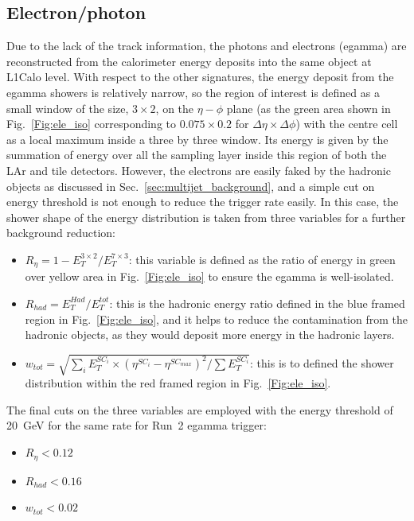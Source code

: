 \subsection{Electron/photon}
Due to the lack of the track information, the photons and electrons (egamma) are reconstructed from the calorimeter energy deposits into the same object at L1Calo level. With respect to the other signatures, the energy deposit from the egamma  showers is relatively narrow, so the region of interest is defined as a small window of the size, $3\times2$, on the $\eta-\phi$ plane (as the green area shown in Fig.~\ref{Fig:ele_iso} corresponding to $0.075\times0.2$ for $\Delta\eta\times\Delta\phi$) with the centre cell as a local maximum inside a three by three window. Its energy is given by the summation of energy over all the sampling layer inside this region of both the LAr and tile detectors. However, the electrons are easily faked by the hadronic objects as discussed in Sec.~\ref{sec:multijet_background}, and a simple cut on energy threshold is not enough to reduce the trigger rate easily. In this case, the shower shape of the energy distribution is taken from three variables for a further background reduction:
\begin{itemize}
	\item $R_\eta=1-E_{T}^{3\times2}/E_{T}^{7\times3}$: this variable is defined as the ratio of energy in green over yellow area in Fig.~\ref{Fig:ele_iso} to ensure the egamma is well-isolated. 
	\item $R_{had} = E^{Had}_{T}/E^{tot}_{T}$: this is the hadronic energy ratio defined in the blue framed region in Fig.~\ref{Fig:ele_iso}, and it helps to reduce the contamination from the hadronic objects, as they would deposit more energy in the hadronic layers.
	\item $w_{tot}=\sqrt{\sum_i E^{SC_i}_{T}\times(\eta^{SC_i}-\eta^{SC_{max}})^2/\sum E^{SC_i}_{T}}$: this is to defined the shower distribution within the red framed region in Fig.~\ref{Fig:ele_iso}. 
\end{itemize}
The final cuts on the three variables are employed with the energy threshold of 20~GeV for the same rate for Run~2 egamma trigger:
\begin{itemize}
	\item $R_\eta<0.12$
	\item $R_{had}<0.16$
	\item $w_{tot}<0.02$
\end{itemize}

